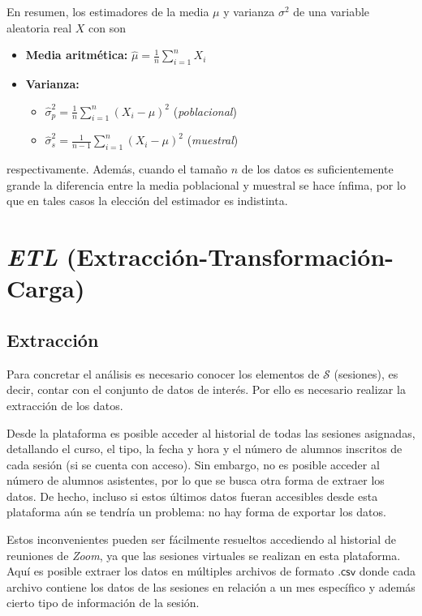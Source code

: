 \documentclass[11pt,a4paper]{book}
\theoremstyle{definition}%
\begin{document}
            En resumen, los estimadores de la media $\mu$ y varianza $\sigma^2$ de una variable aleatoria real $X$ con son
            \begin{itemize}
                \item \textbf{Media aritmética:} $\hat{\mu}=\frac{1}{n}\sum_{i=1}^n X_i$
                 \item \textbf{Varianza:}
                 \begin{itemize}
                     \item $\hat{\sigma}_p^2=\frac{1}{n}\sum_{i=1}^n (X_i-\mu)^2$ (\textit{poblacional})
                     \item $\hat{\sigma}_s^2=\frac{1}{n-1}\sum_{i=1}^n (X_i-\mu)^2$ (\textit{muestral})
                 \end{itemize}
            \end{itemize}
            respectivamente. Además, cuando el tamaño $n$ de los datos es suficientemente grande la diferencia entre la media poblacional y muestral se hace ínfima, por lo que en tales casos la elección del estimador es indistinta.
        
        \section{\textit{ETL} (Extracción-Transformación-Carga)}
            \subsection{Extracción}
                Para concretar el análisis es necesario conocer los elementos de $\mathcal{S}$ (sesiones), es decir, contar con el conjunto de datos de interés. Por ello es necesario realizar la extracción de los datos.
                
                Desde la plataforma \cite{utp:reservas} es posible acceder al historial de todas las sesiones asignadas, detallando el curso, el tipo, la  fecha y hora y el número de alumnos inscritos de cada sesión (si se cuenta con acceso). Sin embargo, no es posible acceder al número de alumnos asistentes, por lo que se busca otra forma de extraer los datos. De hecho, incluso si estos últimos datos fueran accesibles desde esta plataforma aún se tendría un problema: no hay forma de exportar los datos.
    
                Estos inconvenientes pueden ser fácilmente resueltos accediendo al historial de reuniones de \textit{Zoom}, ya que las sesiones virtuales se realizan en esta plataforma. Aquí es posible extraer los datos en múltiples archivos de formato $\mathsf{.csv}$ donde cada archivo contiene los datos de las sesiones en relación a un mes específico y además cierto tipo de información de la sesión.
                
\end{document}
